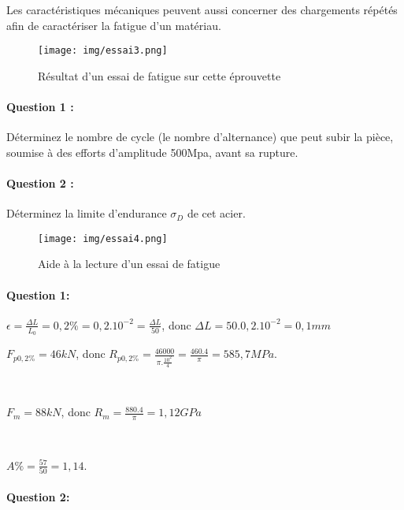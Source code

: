 Les caractéristiques mécaniques peuvent aussi concerner des chargements répétés afin de caractériser la fatigue d'un matériau.

\begin{figure}[!h]
\centering\texttt{[image: img/essai3.png]}
  \caption{Résultat d'un essai de fatigue sur cette éprouvette}
  \label{img:image7}
\end{figure}

\paragraph{Question 1 :} Déterminez le nombre de cycle (le nombre d'alternance) que peut subir la pièce, soumise à des efforts d'amplitude 500Mpa, avant sa rupture.

\paragraph{Question 2 :} Déterminez la limite d'endurance $\sigma_D$ de cet acier.

\begin{figure}[!h]
 \centering\texttt{[image: img/essai4.png]}
  \caption{Aide à la lecture d'un essai de fatigue}
  \label{img:image8}
\end{figure}

\ifdef{\public}{}{}

\cleardoublepage

\pagestyle{correction}

\newpage


\paragraph{Question 1:}

$\epsilon=\frac{\Delta L}{L_0}=0,2\%=0,2.10^{-2}=\frac{\Delta L}{50}$, donc $\Delta L=50.0,2.10^{-2}=0,1mm$

$F_{p0,2\%}=46kN$, donc $R_{p0,2\%}=\frac{46000}{\pi.\frac{10^2}{4}}=\frac{460.4}{\pi}=585,7MPa$.

~\

$F_m=88kN$, donc $R_m=\frac{880.4}{\pi}=1,12GPa$

~\

$A\%=\frac{57}{50}=1,14$.

\paragraph{Question 2:}


